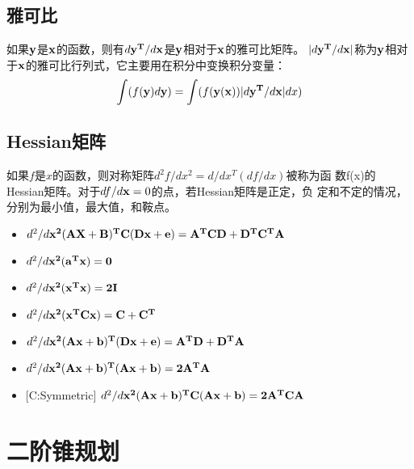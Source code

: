 \documentclass[fontset=none,oneside]{book}
\begin{document}
\subsection{雅可比}
如果$\bf y$是$\bf x$的函数，则有$d{\bf y^T}/d{\bf x}$是$\bf y$相对于$\bf x$的雅可比矩阵。
$|d{\bf y^T}/d{\bf x}|$称为$\bf y$相对于$\bf x$的雅可比行列式，它主要用在积分中变换积分变量：
\begin{equation}
\int (f({\bf y})d{\bf y})=\int(f(\mathbf{y(x)})|d{\bf y^T}/d{\bf x}|dx)
\end{equation}
\subsection{Hessian矩阵}
如果$f$是$x$的函数，则对称矩阵$d^{2}f/dx^{2}=d/dx^{T}(df/dx)$被称为函
数f(x)的Hessian矩阵。对于$df/d{\bf x}=0$的点，若Hessian矩阵是正定，负
定和不定的情况，分别为最小值，最大值，和鞍点。
\begin{shaded}
\begin{itemize}
\item $d^{2}/d{\bf x^{2}(AX+B)^{T}C(Dx+e)=A^{T}CD+D^{T}C^{T}A}$
\item $d^{2}/d{\bf x^{2}(a^{T}x)=0}$
\item $d^{2}/d{\bf x^{2}(x^{T}x)=2I}$
\item $d^{2}/d{\bf x^{2}(x^{T}Cx)=C+C^{T}}$
\item $d^{2}/d{\bf x^{2}(Ax+b)^{T}(Dx+e)=A^{T}D+D^{T}A}$
\item $d^{2}/d{\bf x^{2}(Ax+b)^{T}(Ax+b)=2A^{T}A}$
\item {\color{red}[C:Symmetric]} $d^{2}/d{\bf x^{2}(Ax+b)^{T}C(Ax+b)=2A^{T}CA}$
\end{itemize}
\end{shaded}
\section{二阶锥规划}
\end{document}
